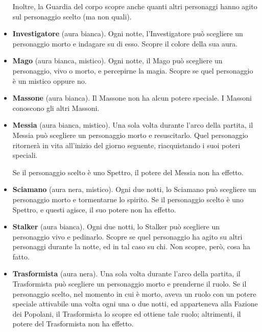 \documentclass[a4paper,10pt]{article}
\begin{document}
\begin{itemize}
 Inoltre, la Guardia del corpo scopre anche quanti altri personaggi hanno agito sul personaggio scelto (ma non quali).
 
 \item {\bf Investigatore} (aura bianca). Ogni notte, l'Investigatore può scegliere un personaggio morto e indagare su di esso. Scopre il colore della sua aura.

 \item {\bf Mago} (aura bianca, mistico). Ogni notte, il Mago può scegliere un personaggio, vivo o morto, e percepirne la magia. Scopre se quel personaggio è un mistico oppure no.
 
 \item {\bf Massone} (aura bianca). Il Massone non ha alcun potere speciale. I Massoni conoscono gli altri Massoni.
 
 \item {\bf Messia} (aura bianca, mistico). Una sola volta durante l'arco della partita, il Messia può scegliere un personaggio morto e resuscitarlo. Quel personaggio ritornerà in vita all'inizio del giorno seguente, riacquistando i suoi poteri speciali.
 
 Se il personaggio scelto è uno Spettro, il potere del Messia non ha effetto.

 \item{\bf Sciamano} (aura nera, mistico). Ogni due notti, lo Sciamano può scegliere un personaggio morto e tormentarne lo spirito. Se il personaggio scelto è uno Spettro, e questi agisce, il suo potere non ha effetto.

 \item {\bf Stalker} (aura bianca). Ogni due notti, lo Stalker può scegliere un personaggio vivo e pedinarlo. Scopre se quel personaggio ha agito su altri personaggi durante la notte, ed in tal caso su chi. Non scopre, però, cosa ha fatto.
 

 \item {\bf Trasformista} (aura nera). Una sola volta durante l'arco della partita, il Trasformista può scegliere un personaggio morto e prenderne il ruolo. Se il personaggio scelto, nel momento in cui è morto, aveva un ruolo con un potere speciale attivabile una volta ogni una o due notti, ed apparteneva alla Fazione dei Popolani, il Trasformista lo scopre ed ottiene tale ruolo; altrimenti, il potere del Trasformista non ha effetto.
 

\end{itemize}
\end{document}
